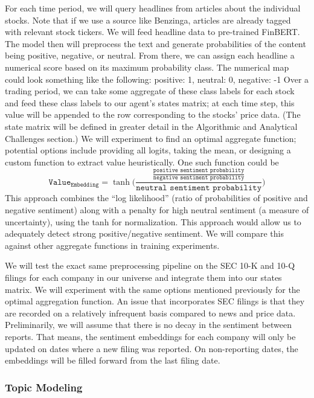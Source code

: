 For each time period, we will query headlines from articles about the individual 
stocks. Note that if we use a source like Benzinga, articles are already tagged 
with relevant stock tickers. We will feed headline data to pre-trained FinBERT. 
The model then will preprocess the text and generate probabilities of the content 
being positive, negative, or neutral. From there, we can assign each headline a 
numerical score based on its maximum probability class. The numerical map could 
look something like the following:  {positive: 1, neutral: 0, negative: -1} 
Over a trading period, we can take some aggregate of these class labels for 
each stock and feed these class labels to our agent’s states matrix; at each 
time step, this value will be appended to the row corresponding to the stocks’ 
price data. (The state matrix will be defined in greater detail in the Algorithmic 
and Analytical Challenges section.) We will experiment to find an optimal 
aggregate function; potential options include providing all logits, 
taking the mean, or designing a custom function to extract value heuristically. 
One such function could be
\[\texttt{Value}_{\texttt{Embedding}} = \tanh\Biggl( \frac{\frac{\texttt{positive sentiment probability}}{\texttt{negative sentiment probability}}}{\texttt{neutral sentiment probability}} \Biggr)\]
This approach combines the “log likelihood” (ratio of probabilities of positive and 
negative sentiment) along with a penalty for high neutral sentiment (a measure of 
uncertainty), using the tanh for normalization. This approach would allow us to 
adequately detect strong positive/negative sentiment. We will compare this against 
other aggregate functions in training experiments.

We will test the exact same preprocessing pipeline on the SEC 10-K and 10-Q filings 
for each company in our universe and integrate them into our states matrix. We will 
experiment with the same options mentioned previously for the optimal aggregation 
function. An issue that incorporates SEC filings is that they are recorded on a 
relatively infrequent basis compared to news and price data. Preliminarily, we will 
assume that there is no decay in the sentiment between reports. That means, 
the sentiment embeddings for each company will only be updated on dates where a
new filing was reported. On non-reporting dates, the embeddings will be filled 
forward from the last filing date. 

\subsubsection{Topic Modeling}

